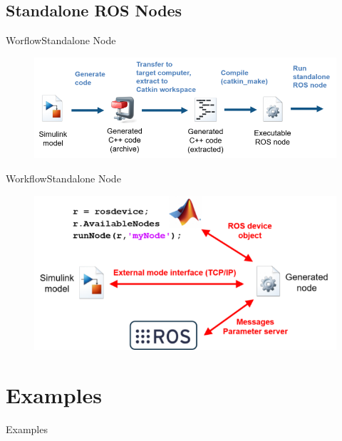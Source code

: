 \documentclass{beamer}
\begin{document}
\subsection{Standalone ROS Nodes}
\begin{frame}{Worflow}{Standalone Node}
\begin{figure}
\includegraphics[scale=0.4]{figs/img/rosstandalone.png}
\end{figure}
\end{frame}
\begin{frame}{Workflow}{Standalone Node}
\begin{figure}
\includegraphics[scale=0.4]{figs/img/rosstandalone2.png}
\end{figure}
\end{frame}
\section{Examples}
\begin{frame}{Examples}

\end{frame}
\end{document}
